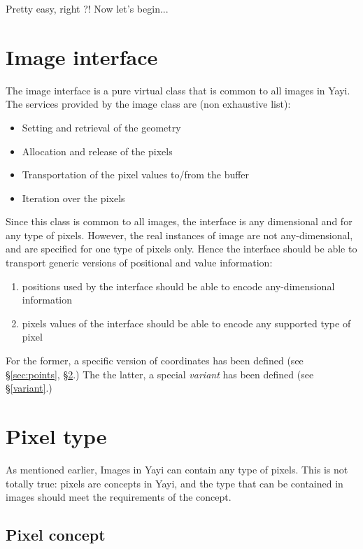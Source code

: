 Pretty easy, right ?! Now let's begin...


\section{Image interface}
\label{image:interface}
The image interface is a pure virtual class that is common to all images in Yayi. The services provided by the image class are (non exhaustive list):
\begin{itemize}
\item Setting and retrieval of the geometry
\item Allocation and release of the pixels
\item Transportation of the pixel values to/from the buffer
\item Iteration over the pixels
\end{itemize}

Since this class is common to all images, the interface is any dimensional and for any type of pixels. However, the real instances of image are not any-dimensional, and are specified for one type of pixels only. Hence the interface should be able to transport generic versions of positional and value information:
\begin{enumerate}
\item positions used by the interface should be able to encode any-dimensional information
\item pixels values of the interface should be able to encode any supported type of pixel
\end{enumerate} 

For the former, a specific version of coordinates has been defined (see \S \ref{sec:points}, \S \ref{image:pixel_type}.) The the latter, a special \textit{variant} has been defined (see \S \ref{variant}.)

\section{Pixel type}
\label{image:pixel_type}
As mentioned earlier, Images in Yayi can contain any type of pixels. This is not totally true: pixels are concepts in Yayi, and the type that can be contained in images should meet the requirements of the concept. 

\subsection{Pixel concept}

